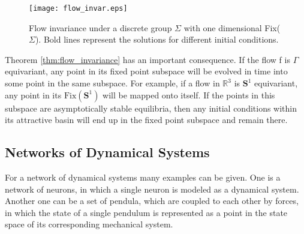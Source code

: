 %
\begin{figure}[H]
\center
\texttt{[image: flow\_invar.eps]}
\label{fig:s1_fixed}
\caption[Flow invariance under $\mathbf{\Sigma}$]{Flow invariance under a discrete group $\Sigma$ with one dimensional Fix($\Sigma$). Bold lines represent the solutions for different initial conditions.}
\end{figure}
%
Theorem \ref{thm:flow_invariance} has an important consequence. If the flow f is $\Gamma$ equivariant, any point in its fixed point subspace will be evolved in time into some point in the same subspace. For example, if a flow in $\mathbb{R}^3$ is $\mathbf{S}^1$ equivariant, any point in its $\text{Fix} (\mathbf{S}^1)$ will be mapped onto itself. If the points in this subspace are asymptotically stable equilibria, then any initial conditions within its attractive basin will end up in the fixed point subspace and remain there. 
%
\subsection{Networks of Dynamical Systems}
%
For a network of dynamical systems many examples can be given. One is a network of neurons, in which a single neuron is modeled as a dynamical system. Another one can be a set of pendula, which are coupled to each other by forces, in which the state of a single pendulum is represented as a point in the state space of its corresponding mechanical system.

